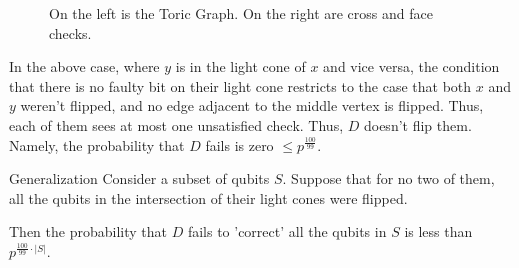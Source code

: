\documentclass{beamer}
\begin{document}
\begin{frame}

    \begin{figure}[H]
\caption{On the left is the Toric Graph. On the right are cross and face checks.}
\label{fig:Toric}
\end{figure}

\end{frame}


\begin{frame}
In the above case, where $y$ is in the light cone of $x$ and vice versa, the condition that there is no faulty bit on their light cone restricts to the case that both $x$ and $y$ weren't flipped, and no edge adjacent to the middle vertex is flipped. Thus, each of them sees at most one unsatisfied check. Thus, $D$ doesn't flip them. Namely, the probability that $D$ fails is zero $\le p^{\frac{100}{99}}$.



\end{frame}

\begin{frame}
 \begin{block}{Generalization}
Consider a subset of qubits $S$. Suppose that for no two of them, all the qubits in the intersection of their light cones were flipped.

Then the probability that $D$ fails to 'correct' all the qubits in $S$ is less than $p^{\frac{100}{99} \cdot |S|}$. 
\end{block}

\end{frame}
\end{document}
